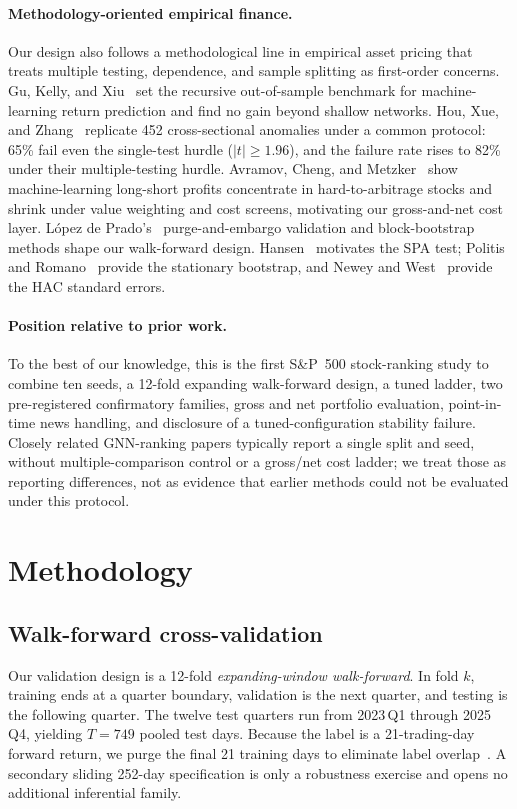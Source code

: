 \documentclass[sigconf,nonacm]{acmart}
\begin{document}
\paragraph{Methodology-oriented empirical finance.} Our design also follows a methodological line in empirical asset pricing that treats multiple testing, dependence, and sample splitting as first-order concerns. Gu, Kelly, and Xiu~\cite{gu2020ml} set the recursive out-of-sample benchmark for machine-learning return prediction and find no gain beyond shallow networks. Hou, Xue, and Zhang~\cite{hou2020replicating} replicate 452 cross-sectional anomalies under a common protocol: 65\% fail even the single-test hurdle ($|t|\ge1.96$), and the failure rate rises to 82\% under their multiple-testing hurdle. Avramov, Cheng, and Metzker~\cite{avramov2023ml} show machine-learning long-short profits concentrate in hard-to-arbitrage stocks and shrink under value weighting and cost screens, motivating our gross-and-net cost layer. L\'opez de Prado's~\cite{lopezdeprado2018advances} purge-and-embargo validation and block-bootstrap methods shape our walk-forward design. Hansen~\cite{hansen2005spa} motivates the SPA test; Politis and Romano~\cite{politis1994stationary} provide the stationary bootstrap, and Newey and West~\cite{newey1987simple} provide the HAC standard errors.

\paragraph{Position relative to prior work.} To the best of our knowledge, this is the first S\&P~500 stock-ranking study to combine ten seeds, a 12-fold expanding walk-forward design, a tuned ladder, two pre-registered confirmatory families, gross and net portfolio evaluation, point-in-time news handling, and disclosure of a tuned-configuration stability failure. Closely related GNN-ranking papers typically report a single split and seed, without multiple-comparison control or a gross/net cost ladder; we treat those as reporting differences, not as evidence that earlier methods could not be evaluated under this protocol.

\section{Methodology}\label{sec:method}

\subsection{Walk-forward cross-validation}
Our validation design is a 12-fold \emph{expanding-window walk-forward}. In fold $k$, training ends at a quarter boundary, validation is the next quarter, and testing is the following quarter. The twelve test quarters run from 2023\,Q1 through 2025\,Q4, yielding $T=749$ pooled test days. Because the label is a 21-trading-day forward return, we purge the final 21 training days to eliminate label overlap~\cite{lopezdeprado2018advances}. A secondary sliding 252-day specification is only a robustness exercise and opens no additional inferential family.
\end{document}
